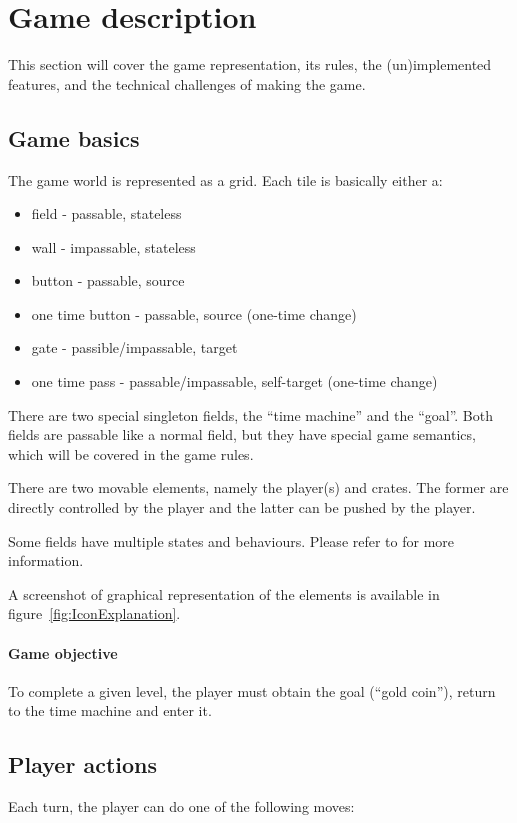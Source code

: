 \section{Game description}

This section will cover the game representation, its rules, the
(un)implemented features, and the technical challenges of making the
game.

\subsection{Game basics}
The game world is represented as a grid.  Each tile is basically
either a:

\begin{itemize}
\item field - passable, stateless
\item wall - impassable, stateless
\item button - passable, source
\item one time button - passable, source (one-time change)
\item gate - passible/impassable, target
\item one time pass - passable/impassable, self-target (one-time change)
\end{itemize}

There are two special singleton fields, the ``time machine'' and
the ``goal''.  Both fields are passable like a normal field, but
they have special game semantics, which will be covered in the
game rules.

There are two movable elements, namely the player(s) and crates.  The
former are directly controlled by the player and the latter can be
pushed by the player.

Some fields have multiple states and behaviours.  Please refer to
 for more information.

A screenshot of graphical representation of the elements is available
in figure~\ref{fig:IconExplanation}.


\paragraph{Game objective}
To complete a given level, the player must obtain the goal (``gold coin''),
return to the time machine and enter it.

\subsection{Player actions}
Each turn, the player can do one of the following moves:


